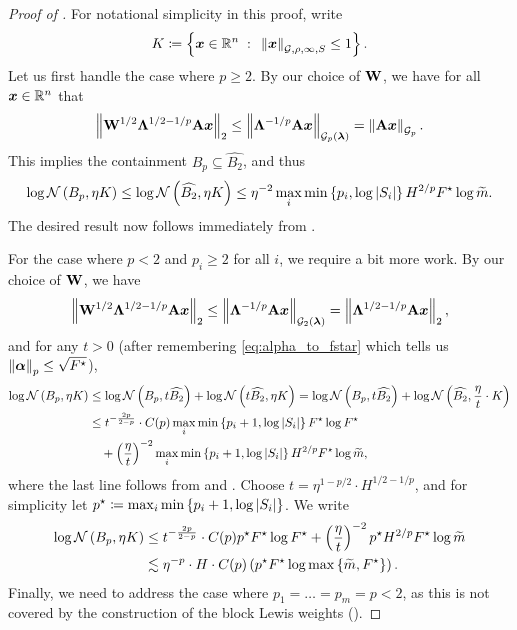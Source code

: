 \documentclass[11pt]{article}
\numberwithin{equation}{section}
\begin{document}
\begin{proof}[Proof of ]
For notational simplicity in this proof, write
\begin{align*}
    K \coloneqq \left\{\bm{x}\in\mathbb{R}^n{\;\; : \;\;} \left\lVert \bm{x} \right\rVert_{\mathcal{G},\rho,\infty, S} \le 1\right\}.
\end{align*}
Let us first handle the case where $p \ge 2$. By our choice of $\mathbf{W}$, we have for all $\bm{x}\in\mathbb{R}^n$ that
\begin{align*}
     \left\lVert \mathbf{W}^{1/2}\mathbf{\Lambda}^{1/2-1/p}\mathbf{A}\bm{x} \right\rVert_{2} \le \left\lVert \mathbf{\Lambda}^{-1/p}\mathbf{A}\bm{x} \right\rVert_{\mathcal{G}_{p}(\bm{\lambda})} = \left\lVert \mathbf{A}\bm{x} \right\rVert_{\mathcal{G}_{p}}.
\end{align*}
This implies the containment $B_p \subseteq \widehat{B_2}$, and thus
\begin{align*}
    \log\mathcal{N}\left(B_p, \eta K\right) \le \log\mathcal{N}\left(\widehat{B_2}, \eta K\right) \le \eta^{-2}\max_{i}\min\left\{p_i,\log\left\lvert S_i \right\rvert\right\}H^{2/p}F^{\star}\log\widetilde{m}.
\end{align*}
The desired result now follows immediately from .

For the case where $p < 2$ and $p_i \ge 2$ for all $i$, we require a bit more work. By our choice of $\mathbf{W}$, we have
\begin{align*}
    \left\lVert \mathbf{W}^{1/2}\mathbf{\Lambda}^{1/2-1/p}\mathbf{A}\bm{x} \right\rVert_{2} \le \left\lVert \mathbf{\Lambda}^{-1/p}\mathbf{A}\bm{x} \right\rVert_{\mathcal{G}_{2}(\bm{\lambda})} = \left\lVert \mathbf{\Lambda}^{1/2-1/p}\mathbf{A}\bm{x} \right\rVert_2,
\end{align*}
and for any $t > 0$ (after remembering \eqref{eq:alpha_to_fstar} which tells us $\left\lVert \bm{\alpha} \right\rVert_p \le \sqrt{F^{\star}}$),
\begin{align*}
    \log\mathcal{N}\left(B_p, \eta K\right) &\le \log\mathcal{N}\left(B_p, t\widehat{B_2}\right) + \log\mathcal{N}\left(t\widehat{B_2}, \eta K\right) = \log\mathcal{N}\left(B_p, t\widehat{B_2}\right) + \log\mathcal{N}\left(\widehat{B_2}, \frac{\eta}{t}\cdot K\right) \\
    &\le t^{-\frac{2p}{2-p}} \cdot C(p)\max_{i}\min\left\{p_i+1,\log\left\lvert S_i \right\rvert\right\}F^{\star}\log F^{\star} \\
    &\quad+\left(\frac{\eta}{t}\right)^{-2}\max_{i}\min\left\{p_i+1,\log\left\lvert S_i \right\rvert\right\}H^{2/p}F^{\star}\log\widetilde{m},
\end{align*}
where the last line follows from  and .
Choose $t=\eta^{1-p/2} \cdot H^{1/2-1/p}$, and for simplicity let $p^{\star} \coloneqq \max_i\min\left\{p_i+1,\log\left\lvert S_i \right\rvert\right\}$. We write
\begin{align*}
    \log\mathcal{N}\left(B_p, \eta K\right) &\le t^{-\frac{2p}{2-p}} \cdot C(p)p^{\star}F^{\star}\log F^{\star} +\left(\frac{\eta}{t}\right)^{-2}p^{\star}H^{2/p}F^{\star}\log\widetilde{m} \\
    &\lesssim \eta^{-p}\cdot H \cdot C(p)\left(p^{\star}F^{\star}\log\max\left\{\widetilde{m},F^{\star}\right\}\right).
\end{align*}
Finally, we need to address the case where $p_1=\dots=p_m=p < 2$, as this is not covered by the construction of the block Lewis weights ().


\end{proof}
\end{document}
